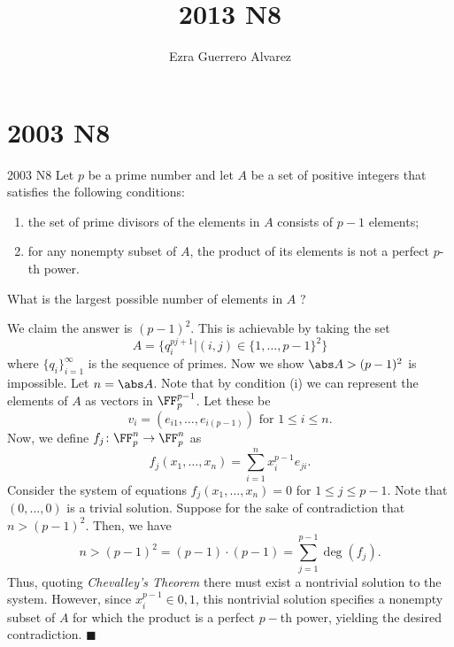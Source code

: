 \documentclass[14pt]{article}
\title{2013 N8}
\author{Ezra Guerrero Alvarez}
\begin{document}
\maketitle
	
\section*{2003 N8}

\begin{statement}{2003 N8}
	Let $p$ be a prime number and let $A$ be a set of positive integers that satisfies the following conditions:
	
	\begin{enumerate}[label=(\roman*)]
	\item the set of prime divisors of the elements in $A$ consists of $p-1$ elements;
	
	\item for any nonempty subset of $A$, the product of its elements is not a perfect $p$-th power.
	\end{enumerate}
	
	What is the largest possible number of elements in $A$ ?
\end{statement}
We claim the answer is $(p-1)^2$. This is achievable by taking the set
\[ A = \{ q_i^{pj+1}\vert(i,j)\in\{1,\ldots,p-1\}^2 \} \]
where $\{q_i\}_{i=1}^{\infty}$ is the sequence of primes. Now we show $\abs A>(p-1)^2$ is impossible. Let $n=\abs A$. Note that by condition (i) we can represent the elements of $A$ as vectors in $\FF_p^{p-1}$. Let these be
\[ v_i = (e_{i1},\ldots,e_{i(p-1)})\text{ for } 1\le i\le n. \]
Now, we define $f_j\colon\FF_p^n\rightarrow\FF_p^n$ as 
\[ f_j(x_1,\ldots,x_n) = \sum_{i=1}^n x_i^{p-1}e_{ji}. \]
Consider the system of equations $f_j(x_1,\ldots,x_n)=0$ for $1\le j\le p-1$. Note that $(0,\ldots,0)$ is a trivial solution. Suppose for the sake of contradiction that $n>(p-1)^2$. Then, we have
\[ n>(p-1)^2=(p-1)\cdot(p-1)=\sum_{j=1}^{p-1}\deg(f_j). \]
Thus, quoting \emph{Chevalley's Theorem} there must exist a nontrivial solution to the system. However, since $x_i^{p-1}\in{0,1}$, this nontrivial solution specifies a nonempty subset of $A$ for which the product is a perfect $p-$th power, yielding the desired contradiction. $\blacksquare$
\end{document}

